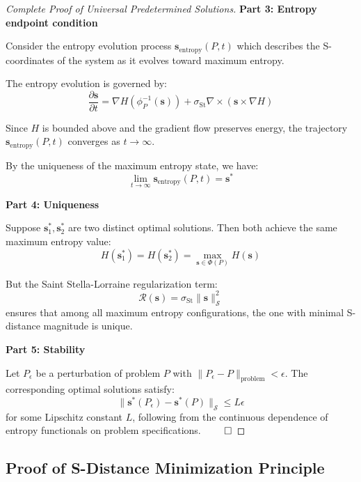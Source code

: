 \documentclass[11pt]{article}
\theoremstyle{definition}
\theoremstyle{remark}
\newcommand{\SEntropy}{\mathcal{S}}
\newcommand{\StellasConstant}{\sigma_{\text{St}}}
\begin{document}
\begin{proof}[Complete Proof of Universal Predetermined Solutions]
\textbf{Part 3: Entropy endpoint condition}

Consider the entropy evolution process $\mathbf{s}_{\text{entropy}}(P, t)$ which describes the S-coordinates of the system as it evolves toward maximum entropy.

The entropy evolution is governed by:
\begin{equation}
\frac{\partial \mathbf{s}}{\partial t} = \nabla H(\phi_P^{-1}(\mathbf{s})) + \StellasConstant \nabla \times (\mathbf{s} \times \nabla H)
\end{equation}

Since $H$ is bounded above and the gradient flow preserves energy, the trajectory $\mathbf{s}_{\text{entropy}}(P, t)$ converges as $t \to \infty$.

By the uniqueness of the maximum entropy state, we have:
\begin{equation}
\lim_{t \to \infty} \mathbf{s}_{\text{entropy}}(P, t) = \mathbf{s}^*
\end{equation}

\textbf{Part 4: Uniqueness}

Suppose $\mathbf{s}_1^*, \mathbf{s}_2^*$ are two distinct optimal solutions. Then both achieve the same maximum entropy value:
\begin{equation}
H(\mathbf{s}_1^*) = H(\mathbf{s}_2^*) = \max_{\mathbf{s} \in \Phi(P)} H(\mathbf{s})
\end{equation}

But the Saint Stella-Lorraine regularization term:
\begin{equation}
\mathcal{R}(\mathbf{s}) = \StellasConstant \|\mathbf{s}\|_{\SEntropy}^2
\end{equation}
ensures that among all maximum entropy configurations, the one with minimal S-distance magnitude is unique.

\textbf{Part 5: Stability}

Let $P_{\epsilon}$ be a perturbation of problem $P$ with $\|P_{\epsilon} - P\|_{\text{problem}} < \epsilon$. The corresponding optimal solutions satisfy:
\begin{equation}
\|\mathbf{s}^*(P_{\epsilon}) - \mathbf{s}^*(P)\|_{\SEntropy} \leq L \epsilon
\end{equation}
for some Lipschitz constant $L$, following from the continuous dependence of entropy functionals on problem specifications. $\qed$
\end{proof}

\subsection{Proof of S-Distance Minimization Principle}
\label{proof:s_minimization_complete}
\end{document}
